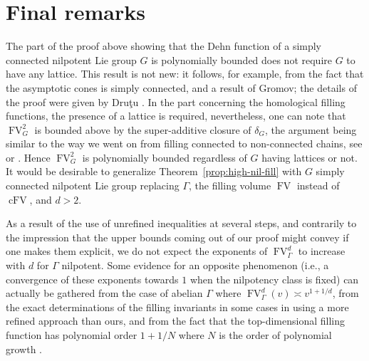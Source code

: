\documentclass[12pt]{amsart}
\theoremstyle{definition}
\begin{document}
\section{Final remarks}

The part of the proof above showing that the Dehn function of a simply connected nilpotent Lie group $G$ is polynomially bounded does not require $G$ to have any lattice. This result is not new: it follows, for example, from the fact that the asymptotic cones is simply connected, and a result of Gromov; the details of the proof were given by Dru\c{t}u \cite[Theorem  4.1]{MR1902363}.
In the part concerning the homological filling functions, the presence of a lattice is required, nevertheless, one can note that $\operatorname{FV}^2_G$ is bounded above by the super-additive closure of $\delta_G$, the argument being similar to the way we went on from filling connected to non-connected chains, see \cite[Remark 12.C.3]{CTD} or \cite[Proposition 2.28]{brady2021homologicaldehnfunctionsgroups}.  
    Hence $\operatorname{FV}^2_G$ is polynomially bounded regardless of $G$ having lattices or not. 
It would be desirable to generalize Theorem~\ref{prop:high-nil-fill} with $G$ simply connected nilpotent Lie group replacing $\Gamma$, the filling volume $\operatorname{FV}$ instead of $\operatorname{cFV}$, and $d>2$. 

As a result of the use of unrefined inequalities at several steps, and {contrarily to the impression that the upper bounds coming out of our proof might convey} if one makes them explicit, we do not expect the exponents of $\operatorname{FV}^d_\Gamma$  to increase with $d$ for $\Gamma$ nilpotent.
Some evidence for an {opposite} phenomenon (i.e., a convergence of these exponents towards $1$ when the nilpotency class is fixed) can actually be gathered from the case of abelian $\Gamma$ where $\operatorname{FV}_\Gamma^d(v) \asymp v^{1+1/d}$, from the exact determinations of the filling invariants in some cases in \cite{YoungFillNil,MR3472846,MR3982578} using a more refined approach than ours, and from the fact that the top-dimensional filling function has polynomial order $1+1/N$ where $N$ is the order of polynomial growth \cite{CSCIsop}.


\end{document}
